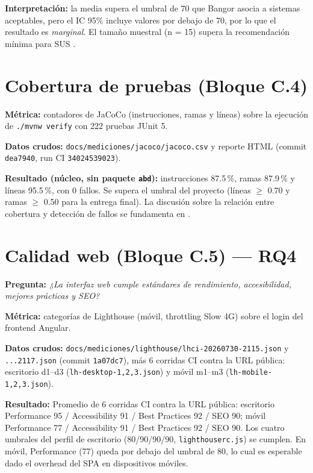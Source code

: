 \textbf{Interpretación:} la media supera el umbral de 70 que Bangor asocia a
sistemas aceptables, pero el IC 95\% incluye valores por debajo de 70, por lo que
el resultado es \emph{marginal}. El tamaño muestral (n = 15) supera la
recomendación mínima para SUS \cite{kortum2013}.

\section{Cobertura de pruebas (Bloque C.4)}
\label{sec:cobertura}

\textbf{Métrica:} contadores de JaCoCo (instrucciones, ramas y líneas) sobre la
ejecución de \texttt{./mvnw verify} con 222 pruebas JUnit 5.

\textbf{Datos crudos:} \texttt{docs/mediciones/jacoco/jacoco.csv} y reporte HTML
(commit \texttt{dea7940}, run CI \texttt{34024539023}).

\textbf{Resultado (núcleo, sin paquete \texttt{abd}):} instrucciones 87.5\,\%,
ramas 87.9\,\% y líneas 95.5\,\%, con 0 fallos. Se supera el umbral del proyecto
(líneas $\ge$ 0.70 y ramas $\ge$ 0.50 para la entrega final). La discusión sobre la relación entre cobertura y detección de fallos se
fundamenta en \cite{inozemtseva2014,gopinath2014,gligoric2013,ivankovic2019}.

\section{Calidad web (Bloque C.5) — RQ4}
\label{sec:lighthouse}

\textbf{Pregunta:} \emph{¿La interfaz web cumple estándares de rendimiento,
accesibilidad, mejores prácticas y SEO?}

\textbf{Métrica:} categorías de Lighthouse \cite{lighthouse} (móvil, throttling Slow 4G)
sobre el login del frontend Angular.

\textbf{Datos crudos:} \texttt{docs/mediciones/lighthouse/lhci-20260730-2115.json} y
\texttt{...2117.json} (commit \texttt{1a07dc7}), más 6 corridas CI contra la URL
pública: escritorio d1--d3 (\texttt{lh-desktop-{1,2,3}.json}) y móvil m1--m3
(\texttt{lh-mobile-{1,2,3}.json}).

\textbf{Resultado:} Promedio de 6 corridas CI contra la URL pública: escritorio
Performance 95 / Accessibility 91 / Best Practices 92 / SEO 90; móvil Performance
77 / Accessibility 91 / Best Practices 92 / SEO 90. Los cuatro umbrales del
perfil de escritorio (80/90/90/90, \texttt{lighthouserc.js}) se cumplen. En móvil,
Performance (77) queda por debajo del umbral de 80, lo cual es esperable dado el
overhead del SPA en dispositivos móviles.

